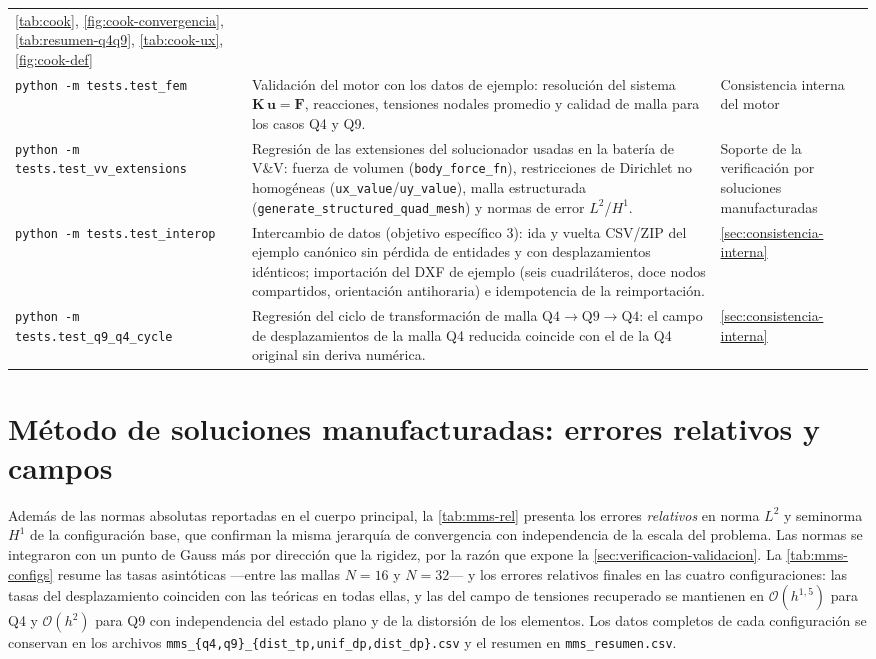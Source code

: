{\begin{longtable}{@{}>{\footnotesize\raggedright\arraybackslash}p{4.3cm} >{\footnotesize\raggedright\arraybackslash}p{5.1cm} >{\footnotesize\raggedright\arraybackslash}p{4.1cm}@{}}
\autoref{tab:cook}, \autoref{fig:cook-convergencia}, \autoref{tab:resumen-q4q9}, \autoref{tab:cook-ux}, \autoref{fig:cook-def} \\
\addlinespace
\texttt{python -m tests.test\_fem} &
Validación del motor con los datos de ejemplo: resolución del sistema $\bm{K}\,\bm{u}=\bm{F}$, reacciones, tensiones nodales promedio y calidad de malla para los casos Q4 y Q9. &
Consistencia interna del motor \\
\addlinespace
\texttt{python -m tests.test\_vv\_extensions} &
Regresión de las extensiones del solucionador usadas en la batería de V\&V: fuerza de volumen (\texttt{body\_force\_fn}), restricciones de Dirichlet no homogéneas (\texttt{ux\_value}/\texttt{uy\_value}), malla estructurada (\texttt{generate\_structured\_quad\_mesh}) y normas de error $L^2$/$H^1$. &
Soporte de la verificación por soluciones manufacturadas \\
\addlinespace
\texttt{python -m tests.test\_interop} &
Intercambio de datos (objetivo específico 3): ida y vuelta CSV/ZIP del ejemplo canónico sin pérdida de entidades y con desplazamientos idénticos; importación del DXF de ejemplo (seis cuadriláteros, doce nodos compartidos, orientación antihoraria) e idempotencia de la reimportación. &
\autoref{sec:consistencia-interna} \\
\addlinespace
\texttt{python -m tests.test\_q9\_q4\_cycle} &
Regresión del ciclo de transformación de malla $\text{Q4}\rightarrow\text{Q9}\rightarrow\text{Q4}$: el campo de desplazamientos de la malla Q4 reducida coincide con el de la Q4 original sin deriva numérica. &
\autoref{sec:consistencia-interna} \\
\end{longtable}}



\section{Método de soluciones manufacturadas: errores relativos y campos}

Además de las normas absolutas reportadas en el cuerpo principal, la \autoref{tab:mms-rel} presenta los errores \emph{relativos} en norma $L^2$ y seminorma $H^1$ de la configuración base, que confirman la misma jerarquía de convergencia con independencia de la escala del problema. Las normas se integraron con un punto de Gauss más por dirección que la rigidez, por la razón que expone la \autoref{sec:verificacion-validacion}. La \autoref{tab:mms-configs} resume las tasas asintóticas ---entre las mallas $N=16$ y $N=32$--- y los errores relativos finales en las cuatro configuraciones: las tasas del desplazamiento coinciden con las teóricas en todas ellas, y las del campo de tensiones recuperado se mantienen en $\mathcal{O}(h^{1{,}5})$ para Q4 y $\mathcal{O}(h^{2})$ para Q9 con independencia del estado plano y de la distorsión de los elementos. Los datos completos de cada configuración se conservan en los archivos \texttt{mms\_\{q4,q9\}\_\{dist\_tp,unif\_dp,dist\_dp\}.csv} y el resumen en \texttt{mms\_resumen.csv}.

